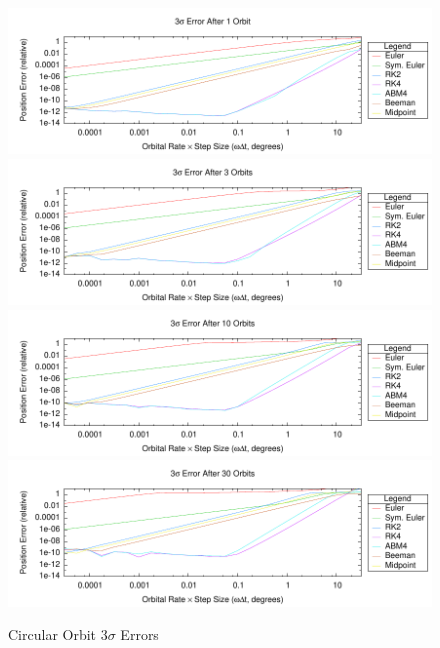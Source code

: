\begin{description}
\begin{figure}[hbtp]
\centering
\includegraphics{figures/plot_TranslationTestOrbit_revs_1_monte_err}
\vspace{2.0ex}
\includegraphics{figures/plot_TranslationTestOrbit_revs_3_monte_err}
\vspace{2.0ex}
\includegraphics{figures/plot_TranslationTestOrbit_revs_10_monte_err}
\vspace{2.0ex}
\includegraphics{figures/plot_TranslationTestOrbit_revs_30_monte_err}
\caption{Circular Orbit 3$\sigma$ Errors}
\label{fig:orbit_err}
\end{figure} 


\end{description}
